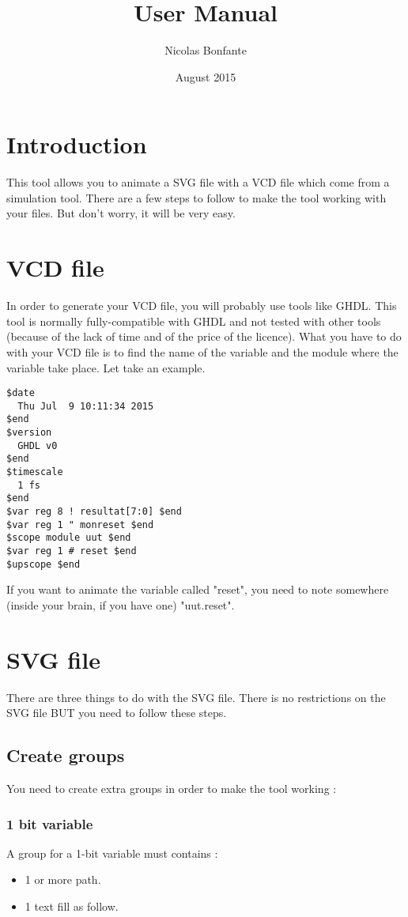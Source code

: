 \documentclass{article}
\title{User Manual}
\author{Nicolas Bonfante}
\date{August 2015}
\begin{document}
\maketitle
\tableofcontents
\newpage

\section{Introduction}
This tool allows you to animate a SVG file with a VCD file which come from a simulation tool. There are a few steps to follow to make the tool working with your
files. But don't worry, it will be very easy.

\section{VCD file}
In order to generate your VCD file, you will probably use tools like GHDL. This tool is normally fully-compatible with GHDL and not tested with other tools (because
of the lack of time and of the price of the licence). 
What you have to do with your VCD file is to find the name of the variable and the module where the variable take place. Let take an example.
\begin{lstlisting}
$date
  Thu Jul  9 10:11:34 2015
$end
$version
  GHDL v0
$end
$timescale
  1 fs
$end
$var reg 8 ! resultat[7:0] $end
$var reg 1 " monreset $end
$scope module uut $end
$var reg 1 # reset $end
$upscope $end
\end{lstlisting}
If you want to animate the variable called "reset", you need to note somewhere (inside your brain, if you have one) "uut.reset".

\section{SVG file}
There are three things to do with the SVG file. There is no restrictions on the SVG file BUT you need to follow these steps.
\subsection{Create groups}
You need to create extra groups in order to make the tool working :
\subsubsection{1 bit variable}
A group for a 1-bit variable must contains : 
\begin{itemize}
\item 1 or more path.
\item 1 text fill as follow.
\end{itemize}
\end{document}

